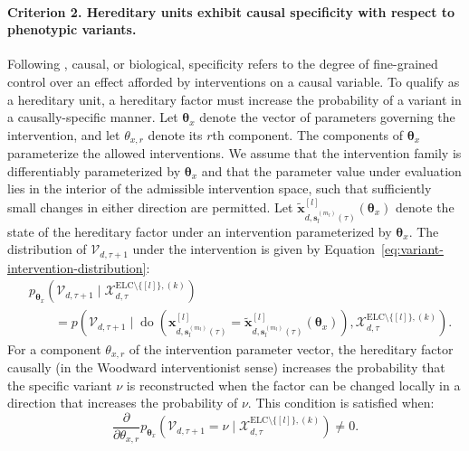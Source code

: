 \documentclass[pdflatex,sn-mathphys-num]{sn-jnl}
\theoremstyle{thmstylethree}
\theoremstyle{thmstyleone}
\newcommand{\ELC}{\mathrm{ELC}}
\begin{document}
\paragraph{Criterion 2. Hereditary units exhibit causal specificity with respect to phenotypic variants.}
Following \cite{griffiths2015measuring, griffiths2017genetic}, causal, or biological, specificity refers to the degree of fine-grained control over an effect afforded by interventions on a causal variable. To qualify as a hereditary unit, a hereditary factor must increase the probability of a variant in a causally-specific manner. Let $\boldsymbol{\theta}_x$ denote the vector of parameters governing the intervention, and let $\theta_{x,r}$ denote its $r$th component. The components of $\boldsymbol{\theta}_x$ parameterize the allowed interventions. We assume that the intervention family is differentiably parameterized by $\boldsymbol{\theta}_x$ and that the parameter value under evaluation lies in the interior of the admissible intervention space, such that sufficiently small changes in either direction are permitted. Let $\widetilde{\mathbf{x}}^{[l]}_{d,\mathbf{s}^{(m_l)}_l(\tau)}(\boldsymbol{\theta}_x)$ denote the state of the hereditary factor under an intervention parameterized by $\boldsymbol{\theta}_x$. The distribution of $\mathcal{V}_{d,\tau+1}$ under the intervention is given by Equation~\eqref{eq:variant-intervention-distribution}:
\begin{equation}
\label{eq:variant-intervention-distribution}
\begin{aligned}
&p_{\boldsymbol{\theta}_x}\left(
\mathcal{V}_{d,\tau+1}
\mid
\mathcal{X}_{d,\tau}^{\ELC\setminus\{[l]\},(k)}
\right)
\\
&\qquad =
p\left(
\mathcal{V}_{d,\tau+1}
\mid
\operatorname{do}\left(
\mathbf{x}^{[l]}_{d,\mathbf{s}^{(m_l)}_l(\tau)}
=
\widetilde{\mathbf{x}}^{[l]}_{d,\mathbf{s}^{(m_l)}_l(\tau)}(\boldsymbol{\theta}_x)
\right),
\mathcal{X}_{d,\tau}^{\ELC\setminus\{[l]\},(k)}
\right).
\end{aligned}
\end{equation}
For a component $\theta_{x,r}$ of the intervention parameter vector, the hereditary factor causally (in the Woodward interventionist sense) increases the probability that the specific variant $\nu$ is reconstructed when the factor can be changed locally in a direction that increases the probability of $\nu$. This condition is satisfied when:
\begin{equation}
\label{eq:variant-probability-increase}
\frac{\partial}{\partial \theta_{x,r}}
p_{\boldsymbol{\theta}_x}\left(
\mathcal{V}_{d,\tau+1}=\nu
\mid
\mathcal{X}_{d,\tau}^{\ELC\setminus\{[l]\},(k)}
\right)
\neq 0.
\end{equation}
\end{document}
